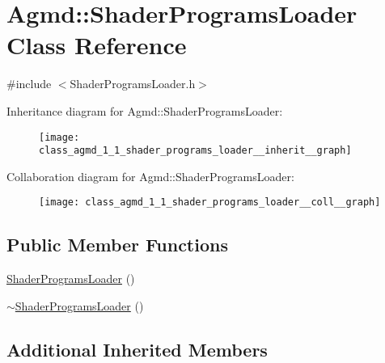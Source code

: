 \hypertarget{class_agmd_1_1_shader_programs_loader}{\section{Agmd\+:\+:Shader\+Programs\+Loader Class Reference}
\label{class_agmd_1_1_shader_programs_loader}
}


{\ttfamily \#include $<$Shader\+Programs\+Loader.\+h$>$}



Inheritance diagram for Agmd\+:\+:Shader\+Programs\+Loader\+:\nopagebreak
\begin{figure}[H]
\begin{center}
\leavevmode
\texttt{[image: class\_agmd\_1\_1\_shader\_programs\_loader\_\_inherit\_\_graph]}
\end{center}
\end{figure}


Collaboration diagram for Agmd\+:\+:Shader\+Programs\+Loader\+:\nopagebreak
\begin{figure}[H]
\begin{center}
\leavevmode
\texttt{[image: class\_agmd\_1\_1\_shader\_programs\_loader\_\_coll\_\_graph]}
\end{center}
\end{figure}
\subsection*{Public Member Functions}
\begin{DoxyCompactItemize}
\item 
\hyperlink{class_agmd_1_1_shader_programs_loader_a3094a4b1b6ec6db147f94c5fbf02d1ef}{Shader\+Programs\+Loader} ()
\item 
\hyperlink{class_agmd_1_1_shader_programs_loader_a47bc693b61795dce16c61815d2ce5d0f}{$\sim$\+Shader\+Programs\+Loader} ()
\end{DoxyCompactItemize}
\subsection*{Additional Inherited Members}


